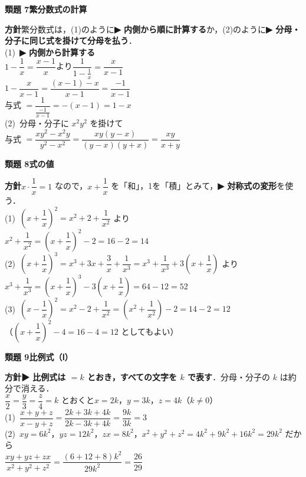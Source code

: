\documentclass[a4paper,11pt]{ltjsarticle}
\newcommand{\ans}[2]{\Needspace{5\baselineskip}\vspace{6pt}%
  {\sffamily\bfseries 類題 #1\quad #2}\par}
\newcommand{\point}[1]{\textsf{\bfseries ▶ #1}}
\begin{document}
\ans{7}{繁分数式の計算}
\begin{kai}
\textbf{方針}\quad 繁分数式は，(1)のように\point{内側から順に計算する}か，(2)のように\point{分母・分子に同じ式を掛けて分母を払う}．\\[2pt]
(1)\ \point{内側から計算する}\\
\hspace*{1.5em}$1-\dfrac1x=\dfrac{x-1}x$\quad より\quad $\dfrac1{1-\frac1x}=\dfrac{x}{x-1}$\\[2pt]
\hspace*{1.5em}$1-\dfrac x{x-1}=\dfrac{(x-1)-x}{x-1}=\dfrac{-1}{x-1}$\\[2pt]
\hspace*{1.5em}与式 $=\dfrac1{\frac{-1}{x-1}}=-(x-1)=1-x$\\[2pt]
(2)\ 分母・分子に $x^2y^2$ を掛けて\\
\hspace*{1.5em}与式 $=\dfrac{xy^2-x^2y}{y^2-x^2}=\dfrac{xy(y-x)}{(y-x)(y+x)}=\dfrac{xy}{x+y}$
\end{kai}

\ans{8}{式の値}
\begin{kai}
\textbf{方針}\quad $x\cdot\dfrac1x=1$ なので，$x+\dfrac1x$ を「和」，1を「積」とみて，\point{対称式の変形}を使う．\\[2pt]
(1)\ $\left(x+\dfrac1x\right)^2=x^2+2+\dfrac1{x^2}$ より\\
\hspace*{1.5em}$x^2+\dfrac1{x^2}=\left(x+\dfrac1x\right)^2-2=16-2=14$\\[2pt]
(2)\ $\left(x+\dfrac1x\right)^3=x^3+3x+\dfrac3x+\dfrac1{x^3}=x^3+\dfrac1{x^3}+3\left(x+\dfrac1x\right)$ より\\
\hspace*{1.5em}$x^3+\dfrac1{x^3}=\left(x+\dfrac1x\right)^3-3\left(x+\dfrac1x\right)=64-12=52$\\[2pt]
(3)\ $\left(x-\dfrac1x\right)^2=x^2-2+\dfrac1{x^2}=\left(x^2+\dfrac1{x^2}\right)-2=14-2=12$\\
\hspace*{1.5em}（$\left(x+\dfrac1x\right)^2-4=16-4=12$ としてもよい）
\end{kai}

\ans{9}{比例式（Ⅰ）}
\begin{kai}
\textbf{方針}\quad \point{比例式は $=k$ とおき，すべての文字を $k$ で表す}．分母・分子の $k$ は約分で消える．\\[2pt]
$\dfrac x2=\dfrac y3=\dfrac z4=k$ とおくと\quad $x=2k$，$y=3k$，$z=4k$\quad （$k\neq0$）\\[2pt]
(1)\ $\dfrac{x+y+z}{x-y+z}=\dfrac{2k+3k+4k}{2k-3k+4k}=\dfrac{9k}{3k}=3$\\[2pt]
(2)\ $xy=6k^2$，$yz=12k^2$，$zx=8k^2$，\quad $x^2+y^2+z^2=4k^2+9k^2+16k^2=29k^2$ だから\\
\hspace*{1.5em}$\dfrac{xy+yz+zx}{x^2+y^2+z^2}=\dfrac{(6+12+8)k^2}{29k^2}=\dfrac{26}{29}$
\end{kai}
\end{document}
